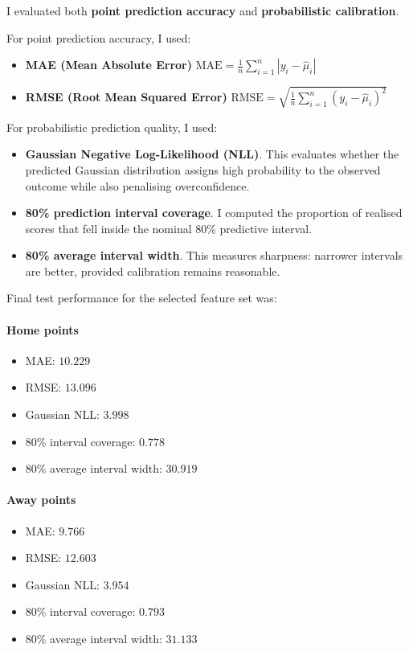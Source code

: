 \documentclass{article}
\begin{document}
I evaluated both \textbf{point prediction accuracy} and \textbf{probabilistic calibration}.

For point prediction accuracy, I used:
\begin{itemize}
    \item \textbf{MAE (Mean Absolute Error)}
    $
    \text{MAE} = \frac{1}{n}\sum_{i=1}^n |y_i - \hat{\mu}_i|
    $
    \item \textbf{RMSE (Root Mean Squared Error)}
    $
    \text{RMSE} = \sqrt{\frac{1}{n}\sum_{i=1}^n (y_i - \hat{\mu}_i)^2}
    $
\end{itemize}

For probabilistic prediction quality, I used:
\begin{itemize}
    \item \textbf{Gaussian Negative Log-Likelihood (NLL)}. This evaluates whether the predicted Gaussian distribution assigns high probability to the observed outcome while also penalising overconfidence.
    \item \textbf{80\% prediction interval coverage}. I computed the proportion of realised scores that fell inside the nominal 80\% predictive interval.
    \item \textbf{80\% average interval width}. This measures sharpness: narrower intervals are better, provided calibration remains reasonable.
\end{itemize}

Final test performance for the selected feature set was:

\paragraph{Home points}
\begin{itemize}
    \item MAE: $10.229$
    \item RMSE: $13.096$
    \item Gaussian NLL: $3.998$
    \item 80\% interval coverage: $0.778$
    \item 80\% average interval width: $30.919$
\end{itemize}

\paragraph{Away points}
\begin{itemize}
    \item MAE: $9.766$
    \item RMSE: $12.603$
    \item Gaussian NLL: $3.954$
    \item 80\% interval coverage: $0.793$
    \item 80\% average interval width: $31.133$
\end{itemize}
\end{document}
